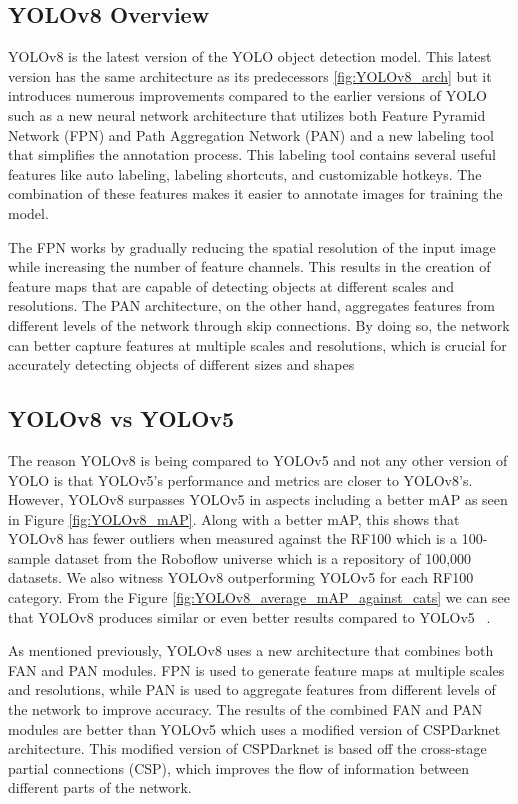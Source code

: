 \documentclass[10pt,twocolumn,letterpaper]{article}
\begin{document}
\subsection{YOLOv8 Overview}
YOLOv8 is the latest version of the YOLO object detection model. This latest version has the same architecture as its predecessors \ref{fig:YOLOv8_arch} but it introduces numerous improvements compared to the earlier versions of YOLO such as a new neural network architecture that utilizes both Feature Pyramid Network (FPN) and Path Aggregation Network (PAN) and a new labeling tool that simplifies the annotation process. This labeling tool contains several useful features like auto labeling, labeling shortcuts, and customizable hotkeys. The combination of these features makes it easier to annotate images for training the model.

The FPN works by gradually reducing the spatial resolution of the input image while increasing the number of feature channels. This results in the creation of feature maps that are capable of detecting objects at different scales and resolutions. The PAN architecture, on the other hand, aggregates features from different levels of the network through skip connections. By doing so, the network can better capture features at multiple scales and resolutions, which is crucial for accurately detecting objects of different sizes and shapes ~\cite{CompReview}

\subsection{YOLOv8 vs YOLOv5}
The reason YOLOv8 is being compared to YOLOv5 and not any other version of YOLO is that YOLOv5’s performance and metrics are closer to YOLOv8’s. However, YOLOv8 surpasses YOLOv5 in aspects including a better mAP as seen in Figure \ref{fig:YOLOv8_mAP}. Along with a better mAP, this shows that YOLOv8 has fewer outliers when measured against the RF100 which is a 100-sample dataset from the Roboflow universe which is a repository of 100,000 datasets. We also witness YOLOv8 outperforming YOLOv5 for each RF100 category. From the Figure \ref{fig:YOLOv8_average_mAP_against_cats} we can see that YOLOv8 produces similar or even better results compared to YOLOv5 ~\cite{YOLOv8Website}.

As mentioned previously, YOLOv8 uses a new architecture that combines both FAN and PAN modules. FPN is used to generate feature maps at multiple scales and resolutions, while PAN is used to aggregate features from different levels of the network to improve accuracy. The results of the combined FAN and PAN modules are better than YOLOv5 which uses a modified version of CSPDarknet architecture. This modified version of CSPDarknet is based off the cross-stage partial connections (CSP), which improves the flow of information between different parts of the network.
\end{document}
